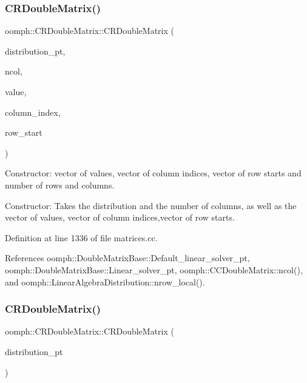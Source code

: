 \subsubsection{\texorpdfstring{C\+R\+Double\+Matrix()}{CRDoubleMatrix()}\hspace{0.1cm}{\footnotesize\ttfamily [2/4]}}
{\footnotesize\ttfamily oomph\+::\+C\+R\+Double\+Matrix\+::\+C\+R\+Double\+Matrix (\begin{DoxyParamCaption}\item[{const \hyperlink{classoomph_1_1LinearAlgebraDistribution}{Linear\+Algebra\+Distribution} $\ast$}]{distribution\+\_\+pt,  }\item[{const unsigned \&}]{ncol,  }\item[{const \hyperlink{classoomph_1_1Vector}{Vector}$<$ double $>$ \&}]{value,  }\item[{const \hyperlink{classoomph_1_1Vector}{Vector}$<$ int $>$ \&}]{column\+\_\+index,  }\item[{const \hyperlink{classoomph_1_1Vector}{Vector}$<$ int $>$ \&}]{row\+\_\+start }\end{DoxyParamCaption})}



Constructor\+: vector of values, vector of column indices, vector of row starts and number of rows and columns. 

Constructor\+: Takes the distribution and the number of columns, as well as the vector of values, vector of column indices,vector of row starts. 

Definition at line 1336 of file matrices.\+cc.



References oomph\+::\+Double\+Matrix\+Base\+::\+Default\+\_\+linear\+\_\+solver\+\_\+pt, oomph\+::\+Double\+Matrix\+Base\+::\+Linear\+\_\+solver\+\_\+pt, oomph\+::\+C\+C\+Double\+Matrix\+::ncol(), and oomph\+::\+Linear\+Algebra\+Distribution\+::nrow\+\_\+local().

\mbox{\label{classoomph_1_1CRDoubleMatrix_a80b1f351988b2a7c0bd39387c77b85f3}} 
\subsubsection{\texorpdfstring{C\+R\+Double\+Matrix()}{CRDoubleMatrix()}\hspace{0.1cm}{\footnotesize\ttfamily [3/4]}}
{\footnotesize\ttfamily oomph\+::\+C\+R\+Double\+Matrix\+::\+C\+R\+Double\+Matrix (\begin{DoxyParamCaption}\item[{const \hyperlink{classoomph_1_1LinearAlgebraDistribution}{Linear\+Algebra\+Distribution} $\ast$}]{distribution\+\_\+pt }\end{DoxyParamCaption})}



